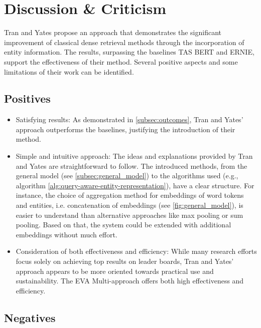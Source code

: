 \section{Discussion \& Criticism}\label{sec:discussion}

Tran and Yates propose an approach that demonstrates the significant improvement of classical dense retrieval methods through the incorporation of entity information. The results, surpassing the baselines TAS BERT and ERNIE, support the effectiveness of their method. Several positive aspects and some limitations of their work can be identified.

\subsection{Positives}

\begin{itemize}
\item Satisfying results: As demonstrated in \autoref{subsec:outcomes}, Tran and Yates' approach outperforms the baselines, justifying the introduction of their method.
\item Simple and intuitive approach: The ideas and explanations provided by Tran and Yates are straightforward to follow. The introduced methods, from the general model (see \autoref{subsec:general_model}) to the algorithms used (e.g., algorithm \ref{alg:query-aware-entity-representation}), have a clear structure. For instance, the choice of aggregation method for embeddings of word tokens and entities, i.e. concatenation of embeddings (see \autoref{fig:general_model}), is easier to understand than alternative approaches like max pooling or sum pooling. Based on that, the system could be extended with additional embeddings without much effort.
\item Consideration of both effectiveness and efficiency: While many research efforts focus solely on achieving top results on leader boards, Tran and Yates' approach appears to be more oriented towards practical use and sustainability. The EVA Multi-approach offers both high effectiveness and efficiency.
\end{itemize}

\subsection{Negatives}


